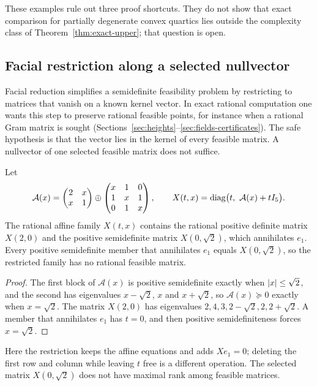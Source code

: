 These examples rule out three proof shortcuts. They do not show that exact
comparison for partially degenerate convex quartics lies outside the
complexity class of Theorem~\ref{thm:exact-upper}; that question is open.

\subsection{Facial restriction along a selected nullvector}
\label{app:bnd-nullvector}

Facial reduction simplifies a semidefinite feasibility problem by restricting
to matrices that vanish on a known kernel vector. In exact rational
computation one wants this step to preserve rational feasible points, for
instance when a rational Gram matrix is sought
(Sections~\ref{sec:heights}--\ref{sec:fields-certificates}). The safe
hypothesis is that the vector lies in the kernel of every feasible matrix. A
nullvector of one selected feasible matrix does not suffice.

\begin{proposition}
\label{prop:bnd-nullvector}
Let
\[
\mathcal A(x)=\begin{pmatrix}2&x\\x&1\end{pmatrix}\oplus
\begin{pmatrix}x&1&0\\1&x&1\\0&1&x\end{pmatrix},\qquad
X(t,x)=\operatorname{diag}\bigl(t,\ \mathcal A(x)+tI_5\bigr).
\]
The rational affine family $X(t,x)$ contains the rational positive definite
matrix $X(2,0)$ and the positive semidefinite matrix $X(0,\sqrt2)$, which
annihilates $e_1$. Every positive semidefinite member that annihilates $e_1$
equals $X(0,\sqrt2)$, so the restricted family has no rational feasible
matrix.
\end{proposition}

\begin{proof}
The first block of $\mathcal A(x)$ is positive semidefinite exactly when
$\left\lvert x\right\rvert\le\sqrt2$, and the second has eigenvalues $x-\sqrt2$, $x$ and
$x+\sqrt2$, so $\mathcal A(x)\succeq0$ exactly when $x=\sqrt2$. The matrix
$X(2,0)$ has eigenvalues $2,4,3,2-\sqrt2,2,2+\sqrt2$. A member that annihilates
$e_1$ has $t=0$, and then positive semidefiniteness forces $x=\sqrt2$.
\end{proof}

Here the restriction keeps the affine equations and adds $Xe_1=0$; deleting
the first row and column while leaving $t$ free is a different operation. The
selected matrix $X(0,\sqrt2)$ does not have maximal rank among feasible
matrices.

